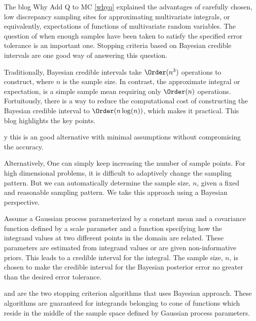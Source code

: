The blog Why Add Q to MC \ref{whyq} explained the advantages of carefully chosen, low discrepancy sampling sites for approximating multivariate integrals, or equivalently, expectations of functions of multivariate random variables.  The question of when enough samples have been taken to satisfy the specified error tolerance is an important one.  Stopping criteria based on Bayesian credible intervals are one good way of answering this question.

Traditionally, Bayesian credible intervals take $\Order(n^3)$ operations to construct, where $n$ is the sample size.  In contrast, the approximate integral or expectation, is a simple sample mean requiring only $\Order(n)$ operations.  Fortuitously, there is a way to reduce the computational cost of constructing the Bayesian credible interval to $\Order(n \log (n))$, which makes it practical.  This blog highlights the key points.

y this is an good alternative with minimal assumptions without compromising the accuracy.

Alternatively, One can simply keep increasing the number of sample points.
For high dimensional problems, it is difficult to adaptively change the sampling pattern. But we can automatically determine the sample size, $n$, given a fixed and reasonable sampling pattern. We take this approach using a Bayesian perspective.

Assume a Gaussian process parameterized by a constant mean and a covariance function defined by a scale parameter and a function specifying how the integrand values at two different points in the domain are related.
These parameters are estimated from integrand values or are given non-informative priors. This leads to a credible interval for the integral. The sample size, $n$, is chosen to make the credible interval for the Bayesian posterior error no greater than the desired error tolerance. 





 and  are the two stopping criterion algorithms that uses Bayesian approach.  These algorithms are guaranteed for integrands belonging to cone of functions which reside in the middle of the sample space defined by Gaussian process parameters. 

